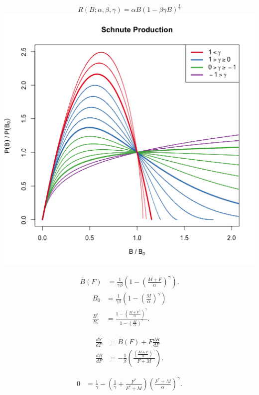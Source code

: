 \documentclass[ xcolor = pdftex, dvipsnames, table ]{beamer}
\begin{document}
%
\begin{frame}
\begin{equation*}
R(B;\alpha, \beta, \gamma) = \alpha B(1-\beta\gamma B)^{\frac{1}{\gamma}}
\end{equation*}
\includegraphics[width=1.1\textwidth]{../../gpBias/g3.png}
\end{frame}

%
\begin{frame}
%
\begin{align}
\bar{B}(F) &= \frac{1}{\gamma \beta}\left(1-\left(\frac{M+F}{\alpha}\right)^\gamma\right).
\label{BsEq}
\end{align}
\begin{align}
B_0 &= \frac{1}{\gamma \beta}\left(1-\left(\frac{M}{\alpha}\right)^\gamma\right) \label{B0S}\\
\frac{B^*}{B_0} &= \frac{1-\left(\frac{M+F^*}{\alpha}\right)^\gamma}{ 1-\left(\frac{M}{\alpha}\right)^\gamma }. \label{BratS}
\end{align}

%
\begin{align}
\frac{d \bar{Y}}{dF} &= \bar B(F) + F \frac{d \bar B}{dF} \label{FderivS}\\
\frac{d \bar B}{dF} &= -\frac{1}{\beta}  \left(\frac{\left(\frac{M+F}{\alpha}\right)^\gamma}{F+M}\right)\label{dBdFS}.
\end{align}

\begin{align}\label{FmsyS}
0 &= \frac{1}{\gamma} - \left(\frac{1}{\gamma} + \frac{F^*}{F^*+M}\right)\left(\frac{F^*+M}{\alpha}\right)^\gamma.
\end{align}
\end{frame}
\end{document}
